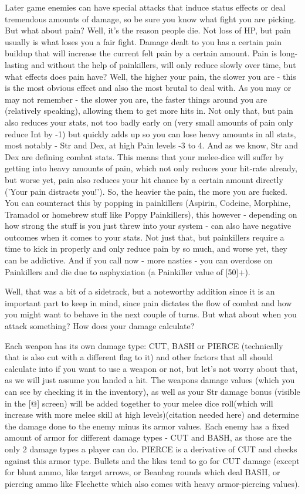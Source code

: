 \documentclass[11pt]{report}
\begin{document}
Later game enemies can have special attacks that induce status effects or deal tremendous amounts of damage, so be sure you know what fight you are picking.
But what about pain? Well, it's the reason people die. Not loss of HP, but pain usually is what loses you a fair fight. Damage dealt to you has a certain pain buildup that will increase the current felt pain by a certain amount. Pain is long-lasting and without the help of painkillers, will only reduce slowly over time, but what effects does pain have?
Well, the higher your pain, the slower you are - this is the most obvious effect and also the most brutal to deal with. As you may or may not remember - the slower you are, the faster things around you are (relatively speaking), allowing them to get more hits in. Not only that, but pain also reduces your stats, not too badly early on (very small amounts of pain only reduce Int by -1) but quickly adds up so you can lose heavy amounts in all stats, most notably - Str and Dex, at high Pain levels -3 to 4. And as we know, Str and Dex are defining combat stats. This means that your melee-dice will suffer by getting into heavy amounts of pain, which not only reduces your hit-rate already, but worse yet, pain also reduces your hit chance by a certain amount directly ('Your pain distracts you!'). So, the heavier the pain, the more you are fucked. You can counteract this by popping in painkillers (Aspirin, Codeine, Morphine, Tramadol or homebrew stuff like Poppy Painkillers), this however - depending on how strong the stuff is you just threw into your system - can also have negative outcomes when it comes to your stats. Not just that, but painkillers require a time to kick in properly and only reduce pain by so much, and worse yet, they can be addictive. And if you call now - more nasties - you can overdose on Painkillers and die due to asphyxiation (a Painkiller value of [50]+).

Well, that was a bit of a sidetrack, but a noteworthy addition since it is an important part to keep in mind, since pain dictates the flow of combat and how you might want to behave in the next couple of turns. But what about when you attack something? How does your damage calculate?

Each weapon has its own damage type: CUT, BASH or PIERCE (technically that is also cut with a different flag to it)
and other factors that all should calculate into if you want to use a weapon or not, but let's not worry about that, as we will just assume you landed a hit. The weapons damage values (which you can see by checking it in the inventory), as well as your Str damage bonus (visible in the [@] screen) will be added together to your melee dice roll(which will increase with more melee skill at high levels)(citation needed here) and determine the damage done to the enemy minus its armor values. Each enemy has a fixed amount of armor for different damage types - CUT and BASH, as those are the only 2 damage types a player can do. PIERCE is a derivative of CUT and checks against this armor type. Bullets and the likes tend to go for CUT damage (except for blunt ammo, like target arrows, or Beanbag rounds which deal BASH, or piercing ammo like Flechette which also comes with heavy armor-piercing values).
\end{document}
